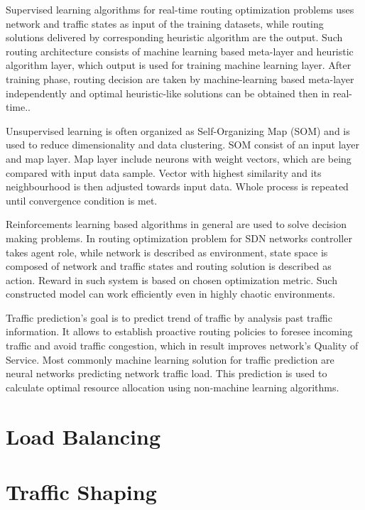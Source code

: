 \documentclass[conference]{IEEEtran}
\begin{document}
Supervised learning algorithms for real-time routing optimization problems uses network and traffic states as input of the training datasets, while routing solutions delivered by corresponding heuristic algorithm are the output. Such routing architecture consists of machine learning based meta-layer and heuristic algorithm layer, which output is used for training machine learning layer. After training phase, routing decision are taken by machine-learning based meta-layer independently and optimal heuristic-like solutions can be obtained then in real-time.\cite{routing3}.\par\newpage
Unsupervised learning is often organized as Self-Organizing Map (SOM) and is used to reduce dimensionality and data clustering. SOM consist of an input layer and map layer. Map layer include neurons with weight vectors, which are being compared with input data sample. Vector with highest similarity and its neighbourhood is then adjusted towards input data. Whole process is repeated until convergence condition is met\cite{routing3}.\par
Reinforcements learning based algorithms in general are used to solve decision making problems. In routing optimization problem for SDN networks controller takes agent role, while network is described as environment, state space is composed of network and traffic states and routing solution is described as action. Reward in such system is based on chosen optimization metric. Such constructed model can work efficiently even in highly chaotic environments\cite{routing3}.\par
Traffic prediction's goal is to predict trend of traffic by analysis past traffic information. It allows to establish proactive routing policies to foresee incoming traffic and avoid traffic congestion, which in result improves network's Quality of Service. Most commonly machine learning solution for traffic prediction are neural networks predicting network traffic load. This prediction is used to calculate optimal resource allocation using non-machine learning algorithms\cite{routing3}.

\section{Load Balancing}

\section{Traffic Shaping}
\end{document}
